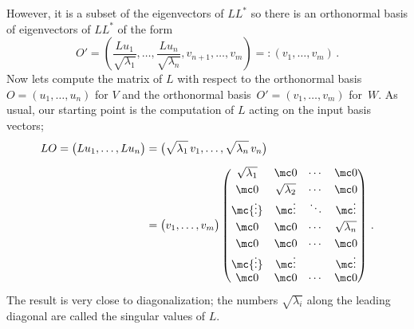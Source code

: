 However,  it is a subset of the eigenvectors of $LL^*$ so there is an orthonormal basis of eigenvectors of $LL^*$ of the form 
\[
O'=\left(\frac{Lu_1}{\sqrt{\lambda_1}},\ldots,\frac{Lu_n}{\sqrt{\lambda_n}},v_{n+1},\ldots,v_{m}\right)=:(v_1,\ldots,v_m)\, .
\]
Now lets compute the matrix of $L$ with respect to the orthonormal basis $O=(u_1,\ldots,u_n)$ for $V$ and the orthonormal basis~$O'=(v_1,\ldots,v_m)$ for~$W$. As usual, our starting point is the computation of $L$ acting on the input basis vectors;
\begin{align*}
LO=\big(Lu_1,\ldots, Lu_n\big)&=
\big(\sqrt{\lambda_1}\,  v_1,\ldots,\sqrt{\lambda_n}\,  v_n\big)\\[2mm]
&=\big(v_1,\ldots,v_m\big)
\begin{pmatrix}
\sqrt{\lambda_1}&\mc0&\cdots&\mc0\\[1mm]
\mc0&\sqrt{\lambda_2}&\cdots&\mc0\\
\mc{\vdots}&\mc\vdots&\ddots&\mc\vdots\\[1mm]
\mc0&\mc0&\cdots&\sqrt{\lambda_n}\\[1mm]
\mc 0 & \mc 0& \cdots &\mc 0\\
\mc{\vdots}&\mc\vdots&&\mc\vdots\\
\mc 0 & \mc 0& \cdots &\mc 0
\end{pmatrix}\, .
\end{align*}
The result is very close to diagonalization; the numbers $\sqrt{\lambda_i}$ along the leading diagonal are called the singular values of $L$.

